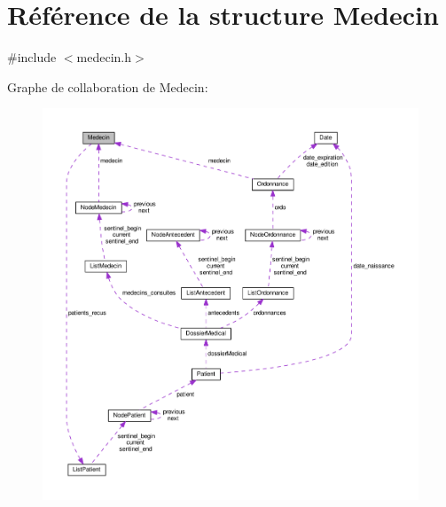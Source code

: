 \hypertarget{struct_medecin}{\section{Référence de la structure Medecin}
\label{struct_medecin}
}


{\ttfamily \#include $<$medecin.\-h$>$}



Graphe de collaboration de Medecin\-:
\nopagebreak
\begin{figure}[H]
\begin{center}
\leavevmode
\includegraphics[width=350pt]{struct_medecin__coll__graph}
\end{center}
\end{figure}
